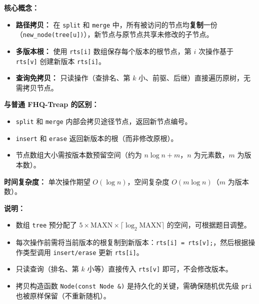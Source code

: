 \textbf{核心概念：}
\begin{itemize}
  \item \textbf{路径拷贝：} 在 \texttt{split} 和 \texttt{merge} 中，所有被访问的节点均\textbf{复制}一份（\texttt{new\_node(tree[u])}），新节点与原节点共享未修改的子节点。
  \item \textbf{多版本根：} 使用 \texttt{rts[i]} 数组保存每个版本的根节点，第 $i$ 次操作基于 \texttt{rts[v]} 创建新版本 \texttt{rts[i]}。
  \item \textbf{查询免拷贝：} 只读操作（查排名、第 $k$ 小、前驱、后继）直接遍历原树，无需拷贝节点。
\end{itemize}

\textbf{与普通 FHQ-Treap 的区别：}
\begin{itemize}
  \item \texttt{split} 和 \texttt{merge} 内部会拷贝途径节点，返回新节点编号。
  \item \texttt{insert} 和 \texttt{erase} 返回新版本的根（而非修改原根）。
  \item 节点数组大小需按版本数预留空间（约为 $n \log n + m$，$n$ 为元素数，$m$ 为版本数）。
\end{itemize}

\textbf{时间复杂度：}
单次操作期望 $O(\log n)$，空间复杂度 $O(m \log n)$（$m$ 为版本数）。



\textbf{说明：}
\begin{itemize}
  \item 数组 \texttt{tree} 预分配了 $5 \times \text{MAXN} \times \lceil \log_2 \text{MAXN} \rceil$ 的空间，可根据题目调整。
  \item 每次操作前需将当前版本的根复制到新版本：\texttt{rts[i] = rts[v];}，然后根据操作类型调用 \texttt{insert/erase} 更新 \texttt{rts[i]}。
  \item 只读查询（排名、第 $k$ 小等）直接传入 \texttt{rts[v]} 即可，不会修改版本。
  \item 拷贝构造函数 \texttt{Node(const Node \&)} 是持久化的关键，需确保随机优先级 \texttt{pri} 也被原样保留（不重新随机）。
\end{itemize}
